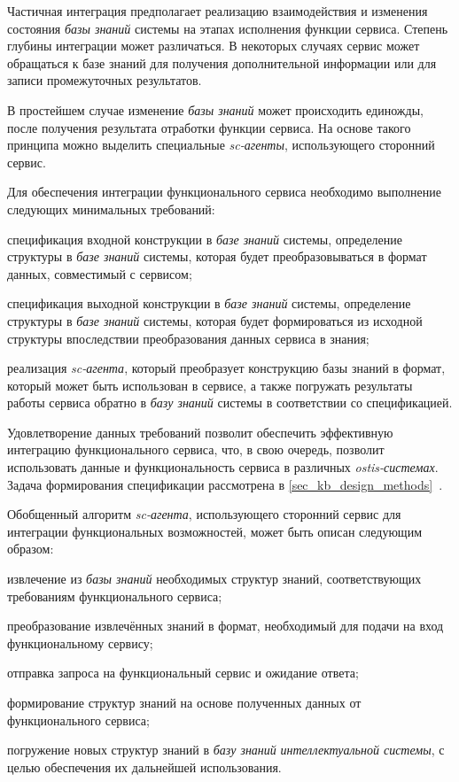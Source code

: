 Частичная интеграция предполагает реализацию взаимодействия и изменения состояния \textit{базы знаний} системы на этапах исполнения функции сервиса. Степень глубины интеграции может различаться. В некоторых случаях сервис может обращаться к базе знаний для получения дополнительной информации или для записи промежуточных результатов. 

В простейшем случае изменение \textit{базы знаний} может происходить единожды, после получения результата отработки функции сервиса. На основе такого принципа можно выделить специальные \textit{sc-агенты}, использующего сторонний сервис. 

Для обеспечения интеграции функционального сервиса необходимо выполнение следующих минимальных требований:
\begin{textitemize}
    \item спецификация входной конструкции в \textit{базе знаний} системы, определение структуры в \textit{базе знаний} системы, которая будет преобразовываться в формат данных, совместимый с сервисом;
    \item спецификация выходной конструкции в \textit{базе знаний} системы, определение структуры в \textit{базе знаний} системы, которая будет формироваться из исходной структуры впоследствии преобразования данных сервиса в знания;
    \item реализация \textit{sc-агента}, который преобразует конструкцию базы знаний в формат, который может быть использован в сервисе, а также погружать результаты работы сервиса обратно в \textit{базу знаний} системы в соответствии со спецификацией.
\end{textitemize}

Удовлетворение данных требований позволит обеспечить эффективную интеграцию функционального сервиса, что, в свою очередь, позволит использовать данные и функциональность сервиса в различных \textit{ostis-системах}. Задача формирования спецификации рассмотрена в \ref{sec_kb_design_methods}~.

Обобщенный алгоритм \textit{sc-агента}, использующего сторонний сервис для интеграции функциональных возможностей, может быть описан следующим образом:

\begin{textitemize}
    \item извлечение из \textit{базы знаний} необходимых структур знаний, соответствующих требованиям функционального сервиса;
    \item преобразование извлечённых знаний в формат, необходимый для подачи на вход функциональному сервису;
    \item отправка запроса на функциональный сервис и ожидание ответа;
    \item формирование структур знаний на основе полученных данных от функционального сервиса;
    \item погружение новых структур знаний в \textit{базу знаний} \textit{интеллектуальной системы}, с целью обеспечения их дальнейшей использования.
\end{textitemize}

